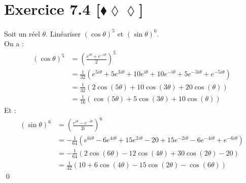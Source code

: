 \documentclass[10pt]{article}
\begin{document}
\section*{Exercice 7.4 [$\blacklozenge\lozenge\lozenge$]}
\begin{tcolorbox}[enhanced, width=7in, center, size=fbox, fontupper=\large, drop shadow southwest]
    Soit un réel $\theta$. Linéariser $(\cos\theta)^5$ et $(\sin\theta)^6$.\\
    On a :
    \begin{align*}
        (\cos\theta)^5&=\left(\frac{e^{i\theta}+e^{-i\theta}}{2}\right)^5\\
        &=\frac{1}{32}\left(e^{5i\theta}+5e^{3i\theta}+10e^{i\theta}+10e^{-i\theta}+5e^{-3i\theta}+e^{-5i\theta}\right)\\
        &=\frac{1}{32}\left(2\cos(5\theta)+10\cos(3\theta)+20\cos(\theta)\right)\\
        &=\frac{1}{16}\left(\cos(5\theta)+5\cos(3\theta)+10\cos(\theta)\right)
    \end{align*}
    Et :
    \begin{align*}
        (\sin\theta)^6&=\left(\frac{e^{i\theta}-e^{-i\theta}}{2i}\right)^6\\
        &=-\frac{1}{64}\left(e^{6i\theta}-6e^{4i\theta}+15e^{2i\theta}-20+15e^{-2i\theta}-6e^{-4i\theta}+e^{-6i\theta}\right)\\
        &=-\frac{1}{64}\left(2\cos(6\theta)-12\cos(4\theta)+30\cos(2\theta)-20\right)\\
        &=\frac{1}{32}\left(10 + 6\cos(4\theta) - 15\cos(2\theta) - \cos(6\theta)\right)
    \end{align*}
    \qed
\end{tcolorbox}

\end{document}
